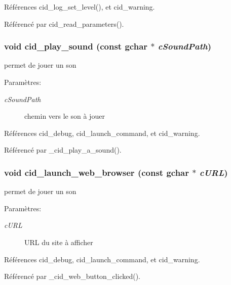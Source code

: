 Références cid\_\-log\_\-set\_\-level(), et cid\_\-warning.

Référencé par cid\_\-read\_\-parameters().
\subsubsection{\setlength{\rightskip}{0pt plus 5cm}void cid\_\-play\_\-sound (const gchar $\ast$ {\em cSoundPath})}\label{cid-utilities_8c_38b7ceae01036942ac314cb69bccaa0d}


permet de jouer un son \begin{Desc}
\item[Paramètres:]
\begin{description}
\item[{\em cSoundPath}]chemin vers le son à jouer \end{description}
\end{Desc}


Références cid\_\-debug, cid\_\-launch\_\-command, et cid\_\-warning.

Référencé par \_\-cid\_\-play\_\-a\_\-sound().
\subsubsection{\setlength{\rightskip}{0pt plus 5cm}void cid\_\-launch\_\-web\_\-browser (const gchar $\ast$ {\em cURL})}\label{cid-utilities_8c_05c186e3f1c09623a2149809a55748ef}


permet de jouer un son \begin{Desc}
\item[Paramètres:]
\begin{description}
\item[{\em cURL}]URL du site à afficher \end{description}
\end{Desc}


Références cid\_\-debug, cid\_\-launch\_\-command, et cid\_\-warning.

Référencé par \_\-cid\_\-web\_\-button\_\-clicked().
